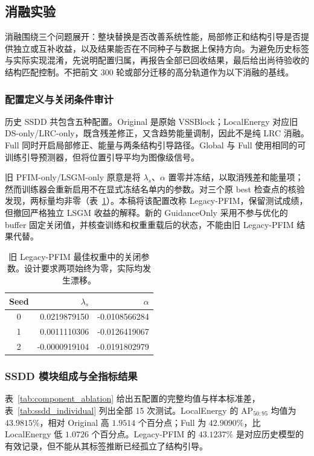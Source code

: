 \subsection{消融实验}\label{sec:ablation}
消融围绕三个问题展开：整块替换是否改善系统性能，局部修正和结构引导是否提供独立或互补收益，以及结果能否在不同种子与数据上保持方向。为避免历史标签与实际实现混淆，先说明配置归属，再报告全部已回收结果，最后给出尚待验收的结构匹配控制。不把前文 300 轮或部分迁移的高分轨道作为以下消融的基线。

\subsubsection{配置定义与关闭条件审计}\label{sec:component_ablation}
历史 SSDD 共包含五种配置。Original 是原始 VSSBlock；LocalEnergy 对应旧 DS-only/LRC-only，既含残差修正，又含趋势能量调制，因此不是纯 LRC 消融。Full 同时开启局部修正、能量与两条结构引导路径。Global 与 Full 使用相同的可训练引导预测器，但将位置引导平均为图像级信号。

旧 PFIM-only/LSGM-only 原意是将 $\lambda_s$、$\alpha$ 置零并冻结，以取消残差和能量项；然而训练器会重新启用不在显式冻结名单内的参数。对三个原 best 检查点的核验发现，两标量均非零（表~\ref{tab:freeze_audit}）。本稿将该配置改称 Legacy-PFIM，保留测试成绩，但撤回严格独立 LSGM 收益的解释。新的 GuidanceOnly 采用不参与优化的 buffer 固定关闭值，并核查训练和权重重载后的状态，不能由旧 Legacy-PFIM 结果代替。

\begin{table}[!t]
\centering\small
\caption{旧 Legacy-PFIM 最佳权重中的关闭参数。设计要求两项始终为零，实际均发生漂移。}\label{tab:freeze_audit}
\begin{tabular}{crr}
\toprule
Seed & $\lambda_s$ & $\alpha$\\
\midrule
0 & 0.0219879150 & -0.0108566284\\
1 & 0.0011110306 & -0.0126419067\\
2 & -0.0000919104 & -0.0191802979\\
\bottomrule
\end{tabular}
\end{table}

\subsubsection{SSDD 模块组成与全指标结果}
表~\ref{tab:component_ablation} 给出五配置的完整均值与样本标准差，表~\ref{tab:ssdd_individual} 列出全部 15 次测试。LocalEnergy 的 AP$_{50:95}$ 均值为 $43.9815\%$，相对 Original 高 $1.9514$ 个百分点；Full 为 $42.9090\%$，比 LocalEnergy 低 $1.0726$ 个百分点。Legacy-PFIM 的 $43.1237\%$ 是对应历史模型的有效记录，但不能从其标签推断已经孤立了结构引导。

